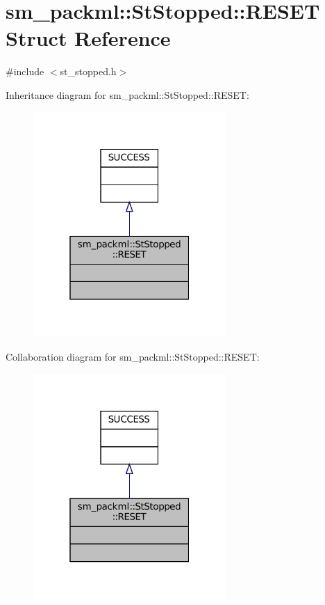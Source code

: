 \hypertarget{structsm__packml_1_1StStopped_1_1RESET}{}\section{sm\+\_\+packml\+:\+:St\+Stopped\+:\+:R\+E\+S\+ET Struct Reference}
\label{structsm__packml_1_1StStopped_1_1RESET}


{\ttfamily \#include $<$st\+\_\+stopped.\+h$>$}



Inheritance diagram for sm\+\_\+packml\+:\+:St\+Stopped\+:\+:R\+E\+S\+ET\+:
\nopagebreak
\begin{figure}[H]
\begin{center}
\leavevmode
\includegraphics[width=208pt]{structsm__packml_1_1StStopped_1_1RESET__inherit__graph}
\end{center}
\end{figure}


Collaboration diagram for sm\+\_\+packml\+:\+:St\+Stopped\+:\+:R\+E\+S\+ET\+:
\nopagebreak
\begin{figure}[H]
\begin{center}
\leavevmode
\includegraphics[width=208pt]{structsm__packml_1_1StStopped_1_1RESET__coll__graph}
\end{center}
\end{figure}


